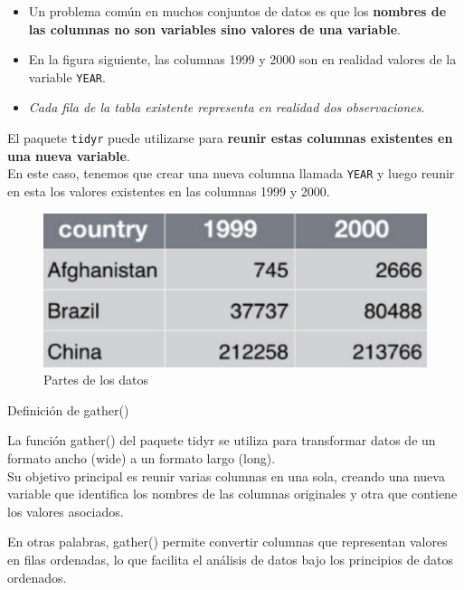 \documentclass[
]{book}
\providecommand{\tightlist}{%
  \setlength{\itemsep}{0pt}\setlength{\parskip}{0pt}}
\begin{document}
\begin{itemize}
\tightlist
\item
  Un problema común en muchos conjuntos de datos es que los \textbf{nombres de las columnas no son variables sino valores de una variable}.\\
\item
  En la figura siguiente, las columnas 1999 y 2000 son en realidad valores de la variable \texttt{YEAR}.\\
\item
  \emph{Cada fila de la tabla existente representa en realidad dos observaciones}.
\end{itemize}

El paquete \texttt{tidyr} puede utilizarse para \textbf{reunir estas columnas existentes en una nueva variable}.\\
En este caso, tenemos que crear una nueva columna llamada \texttt{YEAR} y luego reunir en esta los valores existentes en las columnas 1999 y 2000.

\begin{figure}

{\centering \includegraphics[width=1\linewidth]{images/figura2} 

}

\caption{Partes de los datos}\label{fig:figura2}
\end{figure}

{} Definición de gather()

La función gather() del paquete tidyr se utiliza para transformar datos de un formato
ancho (wide) a un formato largo (long).\\
Su objetivo principal es reunir varias columnas en una sola, creando una nueva variable que identifica
los nombres de las columnas originales y otra que contiene los valores asociados.

En otras palabras, gather() permite convertir columnas que representan valores en
filas ordenadas, lo que facilita el análisis de datos bajo los principios de datos ordenados.
\end{document}
